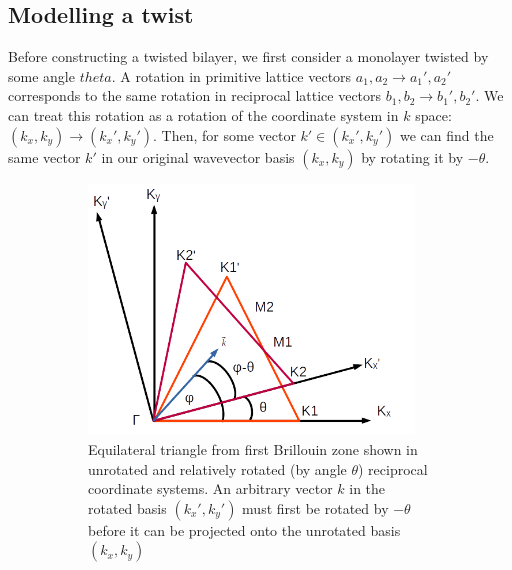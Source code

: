 \documentclass[12pt]{report} %
\begin{document}
\subsection*{Modelling a twist}

  Before constructing a twisted bilayer, we first consider a monolayer twisted by some angle $theta$. A rotation in primitive lattice vectors $a_1, a_2 \rightarrow a_1', a_2'$ corresponds to the same rotation in reciprocal lattice vectors $b_1, b_2 \rightarrow b_1', b_2'$. We can treat this rotation as a rotation of the coordinate system in $k$ space: $(k_x, k_y) \rightarrow (k_x', k_y')$. Then, for some vector $k' \in (k_x', k_y')$ we can find the same vector $k'$ in our original wavevector basis $(k_x, k_y)$ by rotating it by $-\theta$.

\begin{figure}[t]
\centering
  \begin{subfigure}[t]{0.45\textwidth}
    \centering
    \includegraphics[width=0.95\textwidth]{twisted_triangles.png}
    \caption{
      Equilateral triangle from first Brillouin zone shown in unrotated and relatively rotated (by angle $\theta$) reciprocal coordinate systems. An arbitrary vector $k$ in the rotated basis $(k_x', k_y')$ must first be rotated by $-\theta$ before it can be projected onto the unrotated basis $(k_x, k_y)$
    }
    \label{twisted_triangles}
  \end{subfigure}
  \hfill
  \begin{subfigure}[t]{0.45\textwidth}
    \centering

\end{subfigure}
\end{figure}
\end{document}
